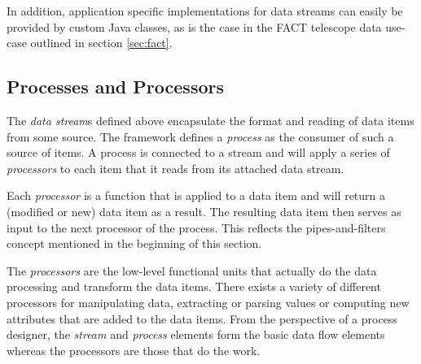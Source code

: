 In addition, application specific implementations for data streams can
easily be provided by custom Java classes, as is the case in the FACT
telescope data use-case outlined in section \ref{sec:fact}.

%


%
%

\subsection{\label{sec:basics}Processes and Processors}
The {\em data stream}s defined above encapsulate the format and reading
of data items from some source. The \streams framework defines a
{\em process} as the consumer of such a source of items. A process is
connected to a stream and will apply a series of {\em processors} to
each item that it reads from its attached data stream.

Each {\em processor} is a function that is applied to a data item and
will return a (modified or new) data item as a result. The resulting
data item then serves as input to the next processor of the
process. This reflects the pipes-and-filters concept mentioned in the
beginning of this section.

The {\em processors} are the low-level functional units that actually
do the data processing and transform the data items. There exists a
variety of different processors for manipulating data, extracting or
parsing values or computing new attributes that are added to the data
items.  From the perspective of a process designer, the {\em stream}
and {\em process} elements form the basic data flow elements whereas
the processors are those that do the work.

